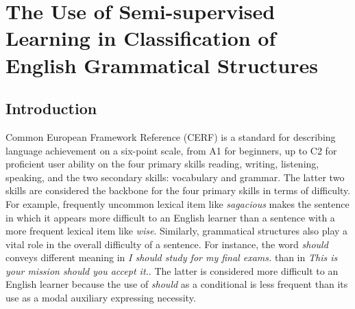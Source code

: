 
\chapter{The Use of Semi-supervised Learning in Classification of English Grammatical Structures} %

\label{Chapter2} %

\section{Introduction}

Common European Framework Reference (CERF) is a standard for describing language achievement on a six-point scale, from A1 for beginners, up to C2 for proficient user ability on the four primary skills reading, writing, listening, speaking, and the two secondary skills: vocabulary and grammar. The latter two skills are considered the backbone for the four primary skills in terms of difficulty. For example, frequently uncommon lexical item like \emph{sagacious} makes the sentence in which it appears more difficult to an English learner than a sentence with a more frequent lexical item like \emph{wise}. Similarly, grammatical structures also play a vital role in the overall difficulty of a sentence. For instance, the word \emph{should} conveys different meaning in \emph{I should study for my final exams.} than in \emph{This is your mission should you accept it.}. The latter is considered more difficult to an English learner because the use of \emph{should} as a conditional is less frequent than its use as a modal auxiliary expressing necessity. 


